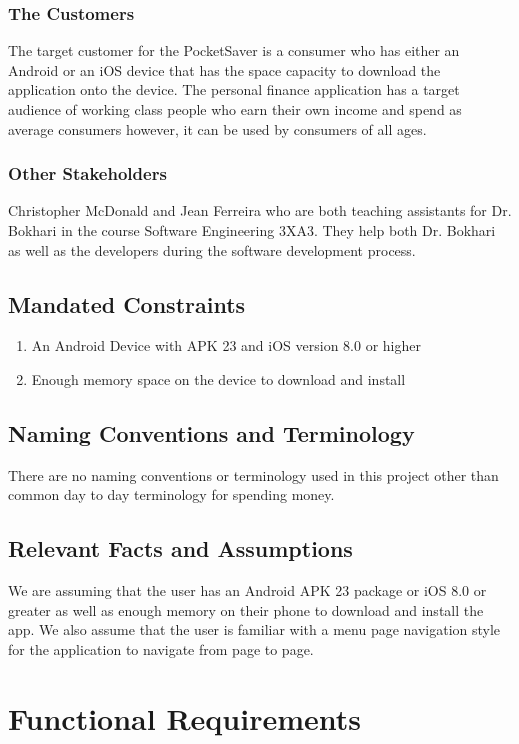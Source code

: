 \documentclass[12pt, titlepage]{article}
\begin{document}
\subsubsection{The Customers}
The target customer for the PocketSaver is a consumer who has either an Android or an iOS device that has the space capacity to download the application onto the device. The personal finance application has a target audience of working class people who earn their own income and spend as average consumers however, it can be used by consumers of all ages.
\subsubsection{Other Stakeholders}
Christopher McDonald and Jean Ferreira who are both teaching assistants for Dr. Bokhari in the course Software Engineering 3XA3. They help both Dr. Bokhari as well as the developers during the software development process.
\subsection{Mandated Constraints}
   \begin{enumerate}
     \item An Android Device with APK 23 and iOS version 8.0 or higher 
     \item Enough memory space on the device to download and install
   \end{enumerate}
\subsection{Naming Conventions and Terminology}
There are no naming conventions or terminology used in this project other than common day to day terminology for spending money. 
\subsection{Relevant Facts and Assumptions}
We are assuming that the user has an Android APK 23 package or iOS 8.0 or greater as well as enough memory on their phone to download and install the app. We also assume that the user is familiar with a menu page navigation style for the application to navigate from page to page. %

\section{Functional Requirements}
\end{document}

